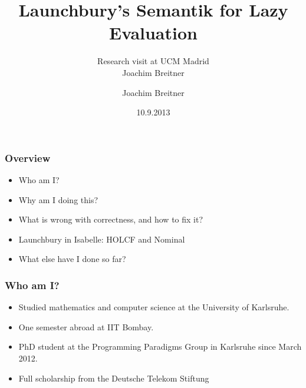 \documentclass{beamer}
\title{Launchbury's Semantik for Lazy Evaluation}
\subtitle{Research visit at UCM Madrid\\
Joachim Breitner}
\author{Joachim Breitner}
\date{10.9.2013}
\institute{LEHRSTUHL PROGRAMMIERPARADIGMEN}%
\institute{PROGRAMMING PARADIGMS GROUP}%
\begin{document}
\maketitle

\begin{frame}
\frametitle{Overview}

\begin{itemize}
\item Who am I?
\item Why am I doing this?
\item What is wrong with correctness, and how to fix it?
\item Launchbury in Isabelle: HOLCF and Nominal
\item What else have I done so far?
\end{itemize}

\end{frame}


\begin{frame}
\frametitle{Who am I?}

\begin{itemize}
\item Studied mathematics and computer science at the University of Karlsruhe.
\item One semester abroad at IIT Bombay.
\item PhD student at the Programming Paradigms Group in Karlsruhe since March 2012.
\item Full scholarship from the Deutsche Telekom Stiftung
\end{itemize}

\end{frame}

\newcommand{\sVar}{\text{Var}}
\newcommand{\sExp}{\text{Exp}}
\newcommand{\sHeap}{\text{Heap}}
\newcommand{\sVal}{\text{Val}}
\newcommand{\sValue}{\text{Value}}
\newcommand{\sEnv}{\text{Env}}
\newcommand{\sApp}[2]{\operatorname{#1}#2}
\newcommand{\sLam}[2]{\text{\textlambda} #1.\, #2}
\newcommand{\sLet}[2]{\text{\textsf{let}}\ #1\ \text{\textsf{in}}\ #2}
\newcommand{\sred}[4]{#1 : #2 \Downarrow #3 : #4}
\newcommand{\sRule}[1]{\text{{\textsc{#1}}}}
\newcommand{\sDeepDup}[1]{\sApp \mdeepDup #1}
\newcommand{\mdeepDup}{\text{\textsf{deepDup}}}
\newcommand{\fv}[1]{\text{fv}(#1)}
\newcommand{\dom}[1]{\text{dom}\,#1}
\newcommand{\fresh}[1]{#1'}
\end{document}
